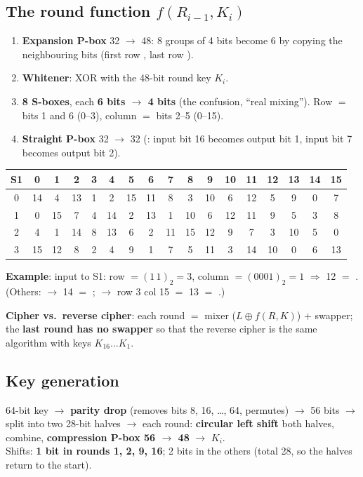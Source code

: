 \subsection{The round function $f(R_{i-1}, K_i)$}
\begin{enumerate}[leftmargin=1.5em]
  \item \textbf{Expansion P-box} 32 $\to$ 48: 8 groups of 4 bits become 6 by copying the neighbouring bits (first row , last row ).
  \item \textbf{Whitener}: XOR with the 48-bit round key $K_i$.
  \item \textbf{8 S-boxes}, each \textbf{6 bits $\to$ 4 bits} (the confusion, ``real mixing''). Row $=$ bits 1 and 6 (0--3), column $=$ bits 2--5 (0--15).
  \item \textbf{Straight P-box} 32 $\to$ 32 (: input bit 16 becomes output bit 1, input bit 7 becomes output bit 2).
\end{enumerate}
\begin{center}\small\setlength{\tabcolsep}{3.5pt}
\begin{tabular}{@{}c|*{16}{c}@{}}
S1 & 0&1&2&3&4&5&6&7&8&9&10&11&12&13&14&15\\ \midrule
0 & 14&4&13&1&2&15&11&8&3&10&6&12&5&9&0&7\\
1 & 0&15&7&4&14&2&13&1&10&6&12&11&9&5&3&8\\
2 & 4&1&14&8&13&6&2&11&15&12&9&7&3&10&5&0\\
3 & 15&12&8&2&4&9&1&7&5&11&3&14&10&0&6&13\\
\end{tabular}
\end{center}
\textbf{Example}: input  to S1: row $= (1\,1)_2 = 3$, column $= (0001)_2 = 1$ $\Rightarrow$ 12 $=$ . (Others:  $\to$ 14 $=$ ;  $\to$ row 3 col 15 $=$ 13 $=$ .)

\textbf{Cipher vs.\ reverse cipher}: each round $=$ mixer ($L \oplus f(R, K)$) $+$ swapper; the \textbf{last round has no swapper} so that the reverse cipher is the same algorithm with keys $K_{16} \dots K_1$.

\subsection{Key generation}
64-bit key $\to$ \textbf{parity drop} (removes bits 8, 16, \dots, 64, permutes) $\to$ 56 bits $\to$ split into two 28-bit halves $\to$ each round: \textbf{circular left shift} both halves, combine, \textbf{compression P-box 56 $\to$ 48} $\to$ $K_i$.\\
Shifts: \textbf{1 bit in rounds 1, 2, 9, 16}; 2 bits in the others (total 28, so the halves return to the start).

